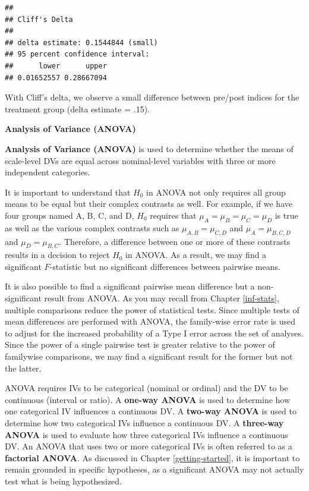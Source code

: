 \documentclass[
]{book}
\begin{document}
\begin{verbatim}
## 
## Cliff's Delta
## 
## delta estimate: 0.1544844 (small)
## 95 percent confidence interval:
##      lower      upper 
## 0.01652557 0.28667094
\end{verbatim}

With Cliff's delta, we observe a small difference between pre/post indices for the treatment group (delta estimate = .15).

\textbf{Analysis of Variance (ANOVA)}

\textbf{Analysis of Variance (ANOVA)} is used to determine whether the means of scale-level DVs are equal across nominal-level variables with three or more independent categories.

It is important to understand that \(H_0\) in ANOVA not only requires all group means to be equal but their complex contrasts as well. For example, if we have four groups named A, B, C, and D, \(H_0\) requires that \(\mu_A = \mu_B = \mu_C = \mu_D\) is true as well as the various complex contrasts such as \(\mu_{A,B} = \mu_{C,D}\) and \(\mu_A = \mu_{B,C,D}\) and \(\mu_D = \mu_{B,C}\). Therefore, a difference between one or more of these contrasts results in a decision to reject \(H_0\) in ANOVA. As a result, we may find a significant \(F\)-statistic but no significant differences between pairwise means.

It is also possible to find a significant pairwise mean difference but a non-significant result from ANOVA. As you may recall from Chapter \ref{inf-stats}, multiple comparisons reduce the power of statistical tests. Since multiple tests of mean differences are performed with ANOVA, the family-wise error rate is used to adjust for the increased probability of a Type I error across the set of analyses. Since the power of a single pairwise test is greater relative to the power of familywise comparisons, we may find a significant result for the former but not the latter.

ANOVA requires IVs to be categorical (nominal or ordinal) and the DV to be continuous (interval or ratio). A \textbf{one-way ANOVA} is used to determine how one categorical IV influences a continuous DV. A \textbf{two-way ANOVA} is used to determine how two categorical IVs influence a continuous DV. A \textbf{three-way ANOVA} is used to evaluate how three categorical IVs influence a continuous DV. An ANOVA that uses two or more categorical IVs is often referred to as a \textbf{factorial ANOVA}. As discussed in Chapter \ref{getting-started}, it is important to remain grounded in specific hypotheses, as a significant ANOVA may not actually test what is being hypothesized.
\end{document}
